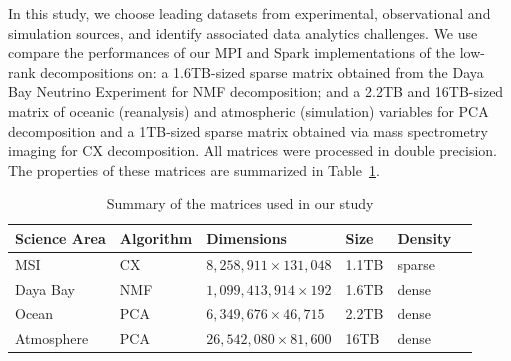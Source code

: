 In this study, we choose leading datasets from experimental, observational and simulation sources, and identify associated data analytics challenges. We use compare the performances of our MPI and Spark implementations of the low-rank decompositions on: a 1.6TB-sized sparse matrix obtained from the Daya Bay Neutrino Experiment for NMF decomposition; and a 2.2TB and 16TB-sized matrix of oceanic (reanalysis) and atmospheric (simulation) variables for PCA decomposition and a 1TB-sized sparse matrix obtained via mass spectrometry imaging for  CX decomposition. All matrices were processed in double precision. The properties of these matrices are summarized in Table~\ref{table:datasets}.

\begin{table}[ht]
\centering
\caption{Summary of the matrices used in our study}
\label{table:datasets}
\begin{tabular}{p{1.5cm}lllll@{}}
\toprule
Science Area & Algorithm & Dimensions & Size  & Density \\ \midrule
MSI      & CX        &  $8,258,911 \times 131,048$          & 1.1TB & sparse  \\
Daya Bay & NMF       &   $1,099,413,914 \times 192$         & 1.6TB & dense \\
Ocean              & PCA       &  $6,349,676 \times 46,715$          & 2.2TB & dense   \\
Atmosphere           & PCA       & $26,542,080 \times 81,600$           & 16TB  & dense    \\ \bottomrule
\end{tabular}
\end{table}

